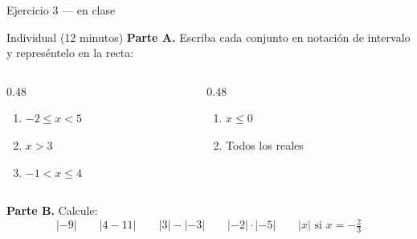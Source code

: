 \documentclass[aspectratio=169,10pt]{beamer}
\begin{document}
\begin{frame}{Ejercicio 3 — en clase}
  \begin{alertblock}{Individual (12 minutos)}
    \scriptsize
    \textbf{Parte A.} Escriba cada conjunto en notación de intervalo y
    represéntelo en la recta:

    \vspace{0.15cm}
    \begin{columns}[T,onlytextwidth]
      \begin{column}{0.48\textwidth}
        \begin{enumerate}\setlength{\itemsep}{-0.02cm}
          \item $-2 \le x < 5$
          \item $x > 3$
          \item $-1 < x \le 4$
        \end{enumerate}
      \end{column}
      \begin{column}{0.48\textwidth}
        \begin{enumerate}\setlength{\itemsep}{-0.02cm}
          \setcounter{enumi}{3}
          \item $x \le 0$
          \item Todos los reales
        \end{enumerate}
      \end{column}
    \end{columns}

    \vspace{0.2cm}
    \textbf{Parte B.} Calcule:
    \[ |{-9}| \qquad |4 - 11| \qquad |3| - |{-3}| \qquad
       |{-2}| \cdot |{-5}| \qquad |x| \text{ si } x = -\tfrac{2}{3} \]
  \end{alertblock}
\end{frame}
\end{document}
